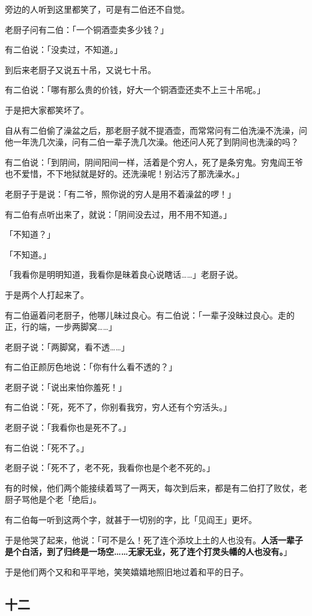 \documentclass[UTF8]{ctexart}
\begin{document}
旁边的人听到这里都笑了，可是有二伯还不自觉。

老厨子问有二伯：「一个铜酒壶卖多少钱？」

有二伯说：「没卖过，不知道。」

到后来老厨子又说五十吊，又说七十吊。

有二伯说：「哪有那么贵的价钱，好大一个铜酒壶还卖不上三十吊呢。」

于是把大家都笑坏了。

自从有二伯偷了澡盆之后，那老厨子就不提酒壶，而常常问有二伯洗澡不洗澡，问他一年洗几次澡，问有二伯一辈子洗几次澡。他还问人死了到阴间也洗澡的吗？

有二伯说：「到阴间，阴间阳间一样，活着是个穷人，死了是条穷鬼。穷鬼阎王爷也不爱惜，不下地狱就是好的。还洗澡呢！别沾污了那洗澡水。」

老厨子于是说：「有二爷，照你说的穷人是用不着澡盆的啰！」

有二伯有点听出来了，就说：「阴间没去过，用不用不知道。」

「不知道？」

「不知道。」

「我看你是明明知道，我看你是昧着良心说瞎话……」老厨子说。

于是两个人打起来了。

有二伯逼着问老厨子，他哪儿昧过良心。有二伯说：「一辈子没昧过良心。走的正，行的端，一步两脚窝……」

老厨子说：「两脚窝，看不透……」

有二伯正颜厉色地说：「你有什么看不透的？」

老厨子说：「说出来怕你羞死！」

有二伯说：「死，死不了，你别看我穷，穷人还有个穷活头。」

老厨子说：「我看你也是死不了。」

有二伯说：「死不了。」

老厨子说：「死不了，老不死，我看你也是个老不死的。」

有的时候，他们两个能接续着骂了一两天，每次到后来，都是有二伯打了败仗，老厨子骂他是个老「绝后」。

有二伯每一听到这两个字，就甚于一切别的字，比「见阎王」更坏。

于是他哭了起来，他说：「可不是么！死了连个添坟上土的人也没有。\textbf{人活一辈子是个白活，到了归终是一场空……无家无业，死了连个打灵头幡的人也没有。}」

于是他们两个又和和平平地，笑笑嬉嬉地照旧地过着和平的日子。

\subsection{十二}
\end{document}
